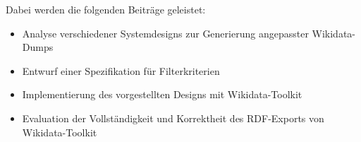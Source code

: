 Dabei werden die folgenden Beiträge geleistet:
\begin{itemize}
  \item Analyse verschiedener Systemdesigns zur Generierung angepasster Wikidata-Dumps
  \item Entwurf einer Spezifikation für Filterkriterien
  \item Implementierung des vorgestellten Designs mit Wikidata-Toolkit
  \item Evaluation der Vollständigkeit und Korrektheit des RDF-Exports von Wikidata-Toolkit
\end{itemize}